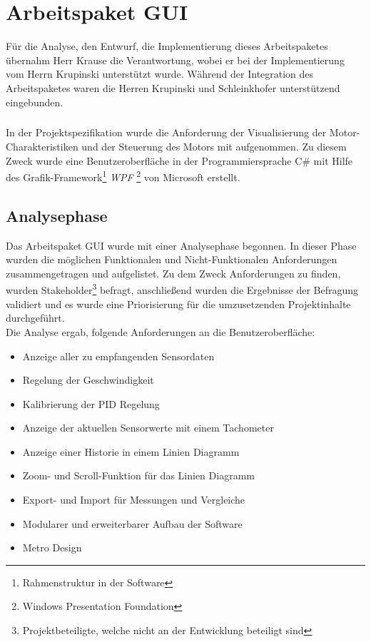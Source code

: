 \graphicspath{{./gui/Bilder/}}

\chapter{Arbeitspaket GUI}
Für die Analyse, den Entwurf, die Implementierung dieses Arbeitspaketes übernahm Herr Krause die Verantwortung, wobei er bei der Implementierung vom Herrn Krupinski unterstützt wurde. Während der Integration des Arbeitspaketes waren die Herren Krupinski und Schleinkhofer unterstützend eingebunden.
\paragraph{}
In der Projektspezifikation wurde die Anforderung der Visualisierung der Motor-Charakteristiken und der Steuerung des Motors mit aufgenommen. Zu diesem Zweck wurde eine Benutzeroberfläche in der Programmiersprache C\# mit Hilfe des Grafik-Framework\footnote{Rahmenstruktur in der Software} \textit{WPF} \footnote{Windows Presentation Foundation} von Microsoft erstellt.

\section{Analysephase}
Das Arbeitspaket GUI wurde mit einer Analysephase begonnen. In dieser Phase wurden die möglichen Funktionalen und Nicht-Funktionalen Anforderungen zusammengetragen und aufgelistet. Zu dem Zweck Anforderungen zu finden, wurden Stakeholder\footnote{Projektbeteiligte, welche nicht an der Entwicklung beteiligt sind} befragt, anschließend wurden die Ergebnisse der Befragung validiert und es wurde eine Priorisierung für die umzusetzenden Projektinhalte durchgeführt.\\
Die Analyse ergab, folgende Anforderungen an die Benutzeroberfläche:

\begin{itemize}
	\item Anzeige aller zu empfangenden Sensordaten
	\item Regelung der Geschwindigkeit
	\item Kalibrierung der PID Regelung
	\item Anzeige der aktuellen Sensorwerte mit einem Tachometer
	\item Anzeige einer Historie in einem Linien Diagramm
	\item Zoom- und Scroll-Funktion für das Linien Diagramm
	\item Export- und Import für Messungen und Vergleiche
	\item Modularer und erweiterbarer Aufbau der Software
	\item Metro Design
\end{itemize} 

